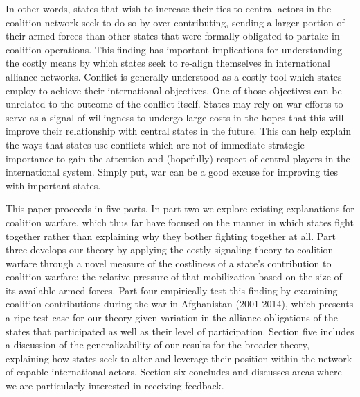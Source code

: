 \documentclass[12pt,letterpaper]{article}
\begin{document}
	In other words, states that wish to increase their ties to central actors in the coalition network seek to do so by over-contributing, sending a larger portion of their armed forces than other states that were formally obligated to partake in coalition operations. This finding has important implications for understanding the costly means by which states seek to re-align themselves in international alliance networks. Conflict is generally understood as a costly tool which states employ to achieve their international objectives. One of those objectives can be unrelated to the outcome of the conflict itself. States may rely on war efforts to serve as a signal of willingness to undergo large costs in the hopes that this will improve their relationship with central states in the future. This can help explain the ways that states use conflicts which are not of immediate strategic importance to gain the attention and (hopefully) respect of central players in the international system. Simply put, war can be a good excuse for improving ties with important states.

	This paper proceeds in five parts. In part two we explore existing explanations for coalition warfare, which thus far have focused on the manner in which states fight together rather than explaining why they bother fighting together at all. Part three develops our theory by applying the costly signaling theory to coalition warfare through a novel measure of the costliness of a state's contribution to coalition warfare: the relative pressure of that mobilization based on the size of its available armed forces. Part four empirically test this finding by examining coalition contributions during the war in Afghanistan (2001-2014), which presents a ripe test case for our theory given variation in the alliance obligations of the states that participated as well as their level of participation. Section five includes a discussion of the generalizability of our results for the broader theory, explaining how states seek to alter and leverage their position within the network of capable international actors. Section six concludes and discusses areas where we are particularly interested in receiving feedback.
\end{document}
